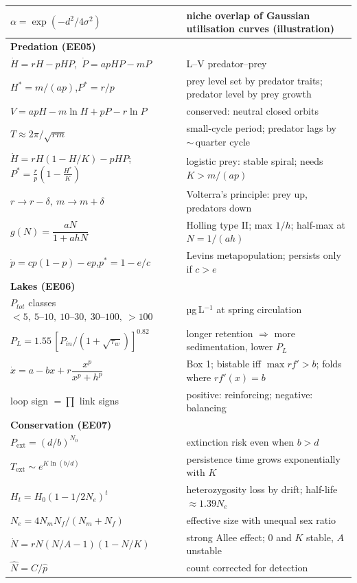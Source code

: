 {\begin{longtable}{p{}p{}}
$\alpha=\exp(-d^2/4\sigma^2)$ & niche overlap of Gaussian utilisation curves (illustration)\\
\midrule
\multicolumn{2}{l}{\textbf{Predation (EE05)}}\\
$\dot H=rH-pHP$,\ $\dot P=apHP-mP$ & L--V predator--prey\\
$H^*=m/(ap)$,\quad $P^*=r/p$ & prey level set by predator traits; predator level by prey growth\\
$V=apH-m\ln H+pP-r\ln P$ & conserved: neutral closed orbits\\
$T\approx2\pi/\sqrt{rm}$ & small-cycle period; predator lags by $\sim$\,quarter cycle\\
$\dot H=rH(1-H/K)-pHP$;\ $P^*=\frac rp(1-\frac{H^*}{K})$ & logistic prey: stable spiral; needs $K>m/(ap)$\\
$r\to r-\delta,\ m\to m+\delta$ & Volterra's principle: prey up, predators down\\
$g(N)=\dfrac{aN}{1+ahN}$ & Holling type II; max $1/h$; half-max at $N=1/(ah)$\\
$\dot p=cp(1-p)-ep$,\quad $p^*=1-e/c$ & Levins metapopulation; persists only if $c>e$\\
\midrule
\multicolumn{2}{l}{\textbf{Lakes (EE06)}}\\
$P_{tot}$ classes $<5,\ 5\text{--}10,\ 10\text{--}30,\ 30\text{--}100,\ >100$ & µg\,L$^{-1}$ at spring circulation\\
$P_L=1.55\,[P_{in}/(1+\sqrt{\tau_w})]^{0.82}$ & longer retention $\Rightarrow$ more sedimentation, lower $P_L$\\
$\dot x=a-bx+r\dfrac{x^p}{x^p+h^p}$ & Box 1; bistable iff $\max rf'>b$; folds where $rf'(x)=b$\\
loop sign $=\prod$ link signs & positive: reinforcing; negative: balancing\\
\midrule
\multicolumn{2}{l}{\textbf{Conservation (EE07)}}\\
$P_{\text{ext}}=(d/b)^{N_0}$ & extinction risk even when $b>d$\\
$T_{\text{ext}}\sim e^{K\ln(b/d)}$ & persistence time grows exponentially with $K$\\
$H_t=H_0(1-1/2N_e)^t$ & heterozygosity loss by drift; half-life $\approx1.39N_e$\\
$N_e=4N_mN_f/(N_m+N_f)$ & effective size with unequal sex ratio\\
$\dot N=rN(N/A-1)(1-N/K)$ & strong Allee effect; 0 and $K$ stable, $A$ unstable\\
$\hat N=C/\hat p$ & count corrected for detection\\

\end{longtable}}
